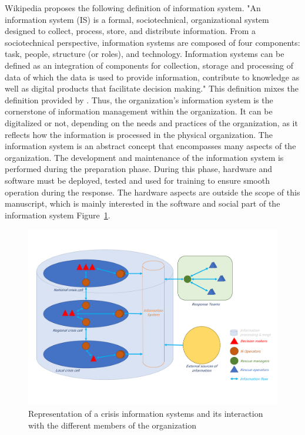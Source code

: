 Wikipedia \textcite{InformationSystem2021} proposes the following definition of information system.
"An information system (IS) is a formal, sociotechnical, organizational system designed to collect, process, store, and distribute information.
From a sociotechnical perspective, information systems are composed of four components: task, people, structure (or roles), and technology.
Information systems can be defined as an integration of components for collection, storage and processing of data of which the data is used
to provide information, contribute to knowledge as well as digital products that facilitate decision making."
This definition mixes the definition provided by \textcite{oharaManagingThreeLevels1999,piccoliInformationSystemsManagers2019,zwassInformationSystemDefinition}.
Thus, the organization's information system is the cornerstone of information management within the organization.
It can be digitalized or not, depending on the needs and practices of the organization, as it reflects how the information is processed in the physical organization.
The information system is an abstract concept that encompasses many aspects of the organization.
The development and maintenance of the information system is performed during the preparation phase.
During this phase, hardware and software must be deployed, tested and used for training to ensure smooth operation during the response.
The hardware aspects are outside the scope of this manuscript, which is mainly interested in the software and social part of the information system Figure~\ref{context:information-system}.

\begin{figure}
    \centering
    \includegraphics[width=\textwidth]{figures/information-system.pdf}
    \caption{Representation of a crisis information systems and its interaction with the different members of the organization}
    \label{context:information-system}
\end{figure}

